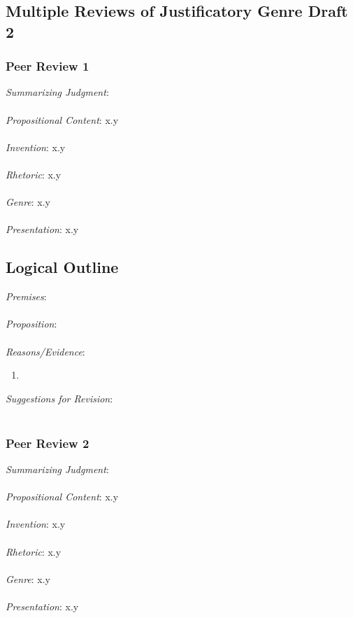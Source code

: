 \documentclass[12pt]{article}
\begin{document}
\newpage
\subsection{Multiple Reviews of Justificatory Genre Draft 2}
\subsubsection*{Peer Review 1} 
\noindent \textit{Summarizing Judgment}: \\ \\
\textit{Propositional Content}: x.y \\ \\ %
\textit{Invention}: x.y \\ \\
\textit{Rhetoric}: x.y \\ \\
\textit{Genre}: x.y \\ \\
\textit{Presentation}: x.y
\subsection*{Logical Outline}
\noindent \textit{Premises}: \\ \\
\textit{Proposition}: \\ \\
\textit{Reasons/Evidence}:
\begin{enumerate}
	\item \ %
\end{enumerate}
\textit{Suggestions for Revision}: \\\\

\subsubsection*{Peer Review 2}
\noindent \textit{Summarizing Judgment}: \\ \\
\textit{Propositional Content}: x.y \\ \\ %
\textit{Invention}: x.y \\ \\
\textit{Rhetoric}: x.y \\ \\
\textit{Genre}: x.y \\ \\
\textit{Presentation}: x.y
\end{document}
